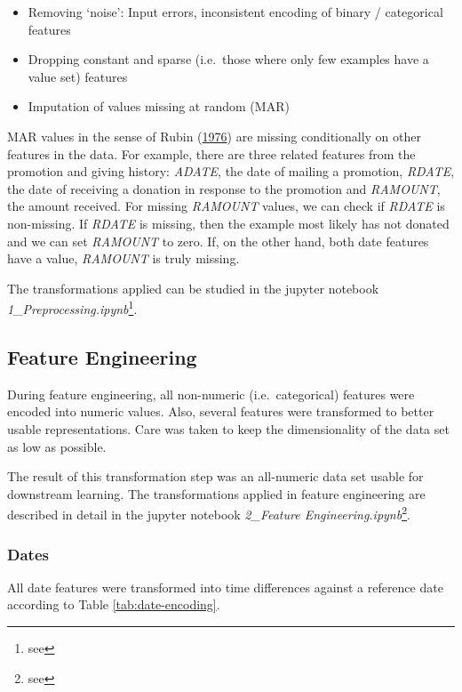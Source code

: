 \documentclass[
  11pt,
  a4paper,
  DIV=12,captions=tableheading,oneside]{scrbook}
\providecommand{\tightlist}{%
  \setlength{\itemsep}{0pt}\setlength{\parskip}{0pt}}
\providecommand{\tightlist}{%
  \setlength{\itemsep}{0pt}\setlength{\parskip}{0pt}}
\begin{document}
\begin{itemize}
\tightlist
\item
  Removing `noise': Input errors, inconsistent encoding of binary / categorical features
\item
  Dropping constant and sparse (i.e.~those where only few examples have a value set) features
\item
  Imputation of values missing at random (MAR)
\end{itemize}

MAR values in the sense of Rubin (\protect\hyperlink{ref-rubin1976inference}{1976}) are missing conditionally on other features in the data. For example, there are three related features from the promotion and giving history: \emph{ADATE}, the date of mailing a promotion, \emph{RDATE}, the date of receiving a donation in response to the promotion and \emph{RAMOUNT}, the amount received. For missing \emph{RAMOUNT} values, we can check if \emph{RDATE} is non-missing. If \emph{RDATE} is missing, then the example most likely has not donated and we can set \emph{RAMOUNT} to zero. If, on the other hand, both date features have a value, \emph{RAMOUNT} is truly missing.

The transformations applied can be studied in the jupyter notebook \emph{1\_Preprocessing.ipynb}\footnote{see }.

\hypertarget{feature-engineering}{%
\subsection{Feature Engineering}\label{feature-engineering}}

During feature engineering, all non-numeric (i.e.~categorical) features were encoded into numeric values. Also, several features were transformed to better usable representations. Care was taken to keep the dimensionality of the data set as low as possible.

The result of this transformation step was an all-numeric data set usable for downstream learning. The transformations applied in feature engineering are described in detail in the jupyter notebook \emph{2\_Feature Engineering.ipynb}\footnote{see }.

\hypertarget{dates}{%
\subsubsection{Dates}\label{dates}}

All date features were transformed into time differences against a reference date according to Table \ref{tab:date-encoding}.
\end{document}
